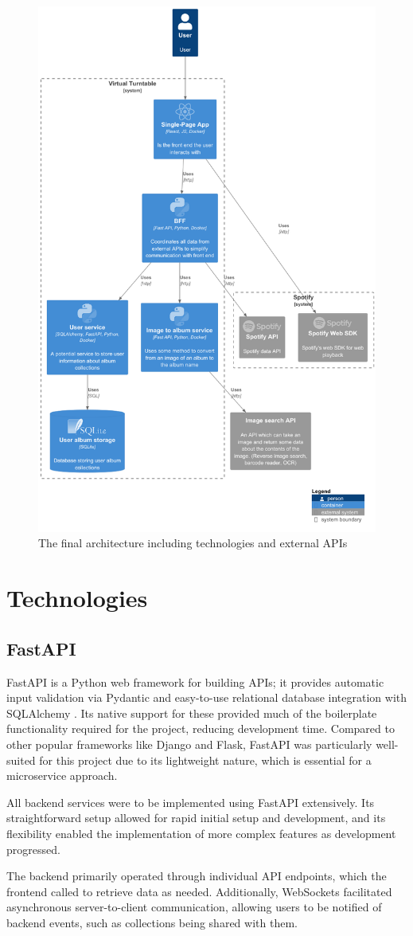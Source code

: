 \begin{figure} [H]
    \centering
    \includegraphics[width=0.5\linewidth]{figures/final_arch.png}
    \caption{The final architecture including technologies and external APIs}
    \label{fig:final-arch}
\end{figure}


\section{Technologies}
\subsection{FastAPI}
FastAPI is a Python web framework for building APIs; it provides automatic input validation via Pydantic and easy-to-use relational database integration with SQLAlchemy \cite{FastAPI}. Its native support for these provided much of the boilerplate functionality required for the project, reducing development time. Compared to other popular frameworks like Django and Flask, FastAPI was particularly well-suited for this project due to its lightweight nature, which is essential for a microservice approach.

All backend services were to be implemented using FastAPI extensively. Its straightforward setup allowed for rapid initial setup and development, and its flexibility enabled the implementation of more complex features as development progressed.

The backend primarily operated through individual API endpoints, which the frontend called to retrieve data as needed. Additionally, WebSockets facilitated asynchronous server-to-client communication, allowing users to be notified of backend events, such as collections being shared with them.

